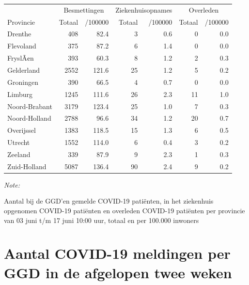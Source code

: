 \documentclass[
  english,
  man,floatsintext]{apa6}
\begin{document}
\begin{table}
\centering
\begin{threeparttable}
\begin{tabular}{lrrrrrr}
\toprule
\multicolumn{1}{c}{ } & \multicolumn{2}{c}{Besmettingen} & \multicolumn{2}{c}{Ziekenhuisopnames} & \multicolumn{2}{c}{Overleden} \\
\cmidrule(l{3pt}r{3pt}){2-3} \cmidrule(l{3pt}r{3pt}){4-5} \cmidrule(l{3pt}r{3pt}){6-7}
Provincie & Totaal & /100000 & Totaal & /100000 & Totaal & /100000\\
\midrule
Drenthe & 408 & 82.4 & 3 & 0.6 & 0 & 0.0\\
Flevoland & 375 & 87.2 & 6 & 1.4 & 0 & 0.0\\
FryslÃ¢n & 393 & 60.3 & 8 & 1.2 & 2 & 0.3\\
Gelderland & 2552 & 121.6 & 25 & 1.2 & 5 & 0.2\\
Groningen & 390 & 66.5 & 4 & 0.7 & 0 & 0.0\\
Limburg & 1245 & 111.6 & 26 & 2.3 & 11 & 1.0\\
Noord-Brabant & 3179 & 123.4 & 25 & 1.0 & 7 & 0.3\\
Noord-Holland & 2788 & 96.6 & 34 & 1.2 & 20 & 0.7\\
Overijssel & 1383 & 118.5 & 15 & 1.3 & 6 & 0.5\\
Utrecht & 1552 & 114.0 & 6 & 0.4 & 3 & 0.2\\
Zeeland & 339 & 87.9 & 9 & 2.3 & 1 & 0.3\\
Zuid-Holland & 5087 & 136.4 & 90 & 2.4 & 9 & 0.2\\
\bottomrule
\end{tabular}
\begin{tablenotes}
\item \textit{Note: } 
\item Aantal bij de GGD’en gemelde COVID-19 patiënten, in het ziekenhuis opgenomen COVID-19 patiënten en overleden COVID-19 patiënten per provincie van 03 juni t/m 17 juni 10:00 uur, totaal en per 100.000 inwoners
\end{tablenotes}
\end{threeparttable}
\end{table}

\newpage

\hypertarget{aantal-covid-19-meldingen-per-ggd-in-de-afgelopen-twee-weken}{%
\section{Aantal COVID-19 meldingen per GGD in de afgelopen twee weken}\label{aantal-covid-19-meldingen-per-ggd-in-de-afgelopen-twee-weken}}
\end{document}
